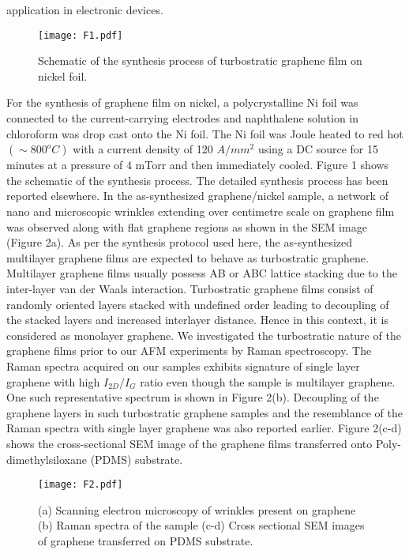 \documentclass[preprint,aps,preprint,amsmath,amssymb]{revtex4-1}
\begin{document}
application in electronic devices.

\begin{figure}[h!]
	
	\texttt{[image: F1.pdf]}
	\caption{Schematic of the synthesis process of turbostratic graphene film on nickel foil.}
	\label{s1}
\end{figure}

For the synthesis of graphene film on nickel, a polycrystalline Ni foil was connected to the current-carrying electrodes and naphthalene solution in chloroform was drop cast onto the Ni foil. The Ni foil was Joule heated to red hot $(\sim800 ^{o}C)$ with a current density of 120 $A/mm^{2}$ using a DC source for 15 minutes at a pressure of 4 mTorr and then immediately cooled. Figure 1 shows the schematic of the synthesis process. The detailed synthesis process has been reported elsewhere.\cite{Kurra} In the as-synthesized graphene/nickel sample, a network of nano and microscopic wrinkles extending over centimetre scale on graphene film was observed along with flat graphene regions as shown in the SEM image (Figure 2a). As per the synthesis protocol used here, the as-synthesized multilayer graphene films are expected to behave as turbostratic graphene. Multilayer graphene films usually possess AB or ABC lattice stacking due to the inter-layer van der Waals interaction. Turbostratic graphene films consist of randomly oriented layers stacked with undefined order leading to decoupling of the stacked layers and increased interlayer distance. Hence in this context, it is considered as monolayer graphene. We investigated the turbostratic nature of the graphene films prior to our AFM experiments by Raman spectroscopy. The Raman spectra acquired on our samples exhibits signature of single layer graphene with high $I_{2D}/I_{G}$ ratio even though the sample is multilayer graphene. One such representative spectrum is shown in Figure 2(b). Decoupling of the graphene layers in such turbostratic graphene samples and the resemblance of the Raman spectra with single layer graphene was also reported earlier\cite{Mogera}. Figure 2(c-d) shows the cross-sectional SEM image of the graphene films transferred onto Poly-dimethylsiloxane (PDMS) substrate.

\begin{figure}[h!]
	
	\texttt{[image: F2.pdf]}
	\caption{(a) Scanning electron microscopy of wrinkles present on graphene (b) Raman spectra of the sample (c-d) Cross sectional SEM images of graphene transferred on PDMS substrate.}
	\label{s1}
\end{figure}
\end{document}
